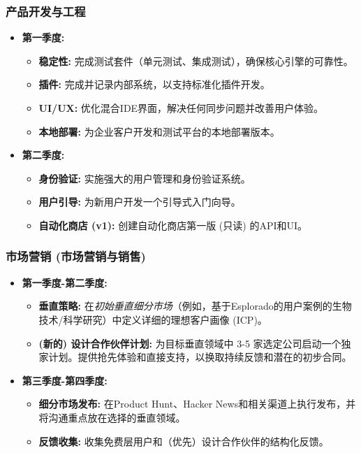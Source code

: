 \documentclass[11pt, a4paper, oneside]{article}
\begin{document}
\subsubsection{产品开发与工程}
\begin{itemize}[leftmargin=*]
    \item \textbf{第一季度:}
    \begin{itemize}
        \item \textbf{稳定性:} 完成测试套件（单元测试、集成测试），确保核心引擎的可靠性。
        \item \textbf{插件:} 完成并记录内部系统，以支持标准化插件开发。
        \item \textbf{UI/UX:} 优化混合IDE界面，解决任何同步问题并改善用户体验。
        \item \textbf{本地部署:} 为企业客户开发和测试平台的本地部署版本。
    \end{itemize}
    \item \textbf{第二季度:}
    \begin{itemize}
        \item \textbf{身份验证:} 实施强大的用户管理和身份验证系统。
        \item \textbf{用户引导:} 为新用户开发一个引导式入门向导。
        \item \textbf{自动化商店 (v1): } 创建自动化商店第一版 (只读) 的API和UI。
    \end{itemize}
\end{itemize}

\subsubsection{市场营销 (市场营销与销售)}
\begin{itemize}[leftmargin=*]
    \item \textbf{第一季度-第二季度:}
    \begin{itemize}
        \item \textbf{垂直策略:} 在\textit{初始垂直细分市场}（例如，基于Esplorado的用户案例的生物技术/科学研究）中定义详细的理想客户画像 (ICP)。
        \item \textbf{(新的) 设计合作伙伴计划:} 为目标垂直领域中 3-5 家选定公司启动一个独家计划。提供抢先体验和直接支持，以换取持续反馈和潜在的初步合同。
    \end{itemize}
    \item \textbf{第三季度-第四季度:}
    \begin{itemize}
        \item \textbf{细分市场发布:} 在Product Hunt、Hacker News和相关渠道上执行发布，并将沟通重点放在选择的垂直领域。
        \item \textbf{反馈收集:} 收集免费层用户和（优先）设计合作伙伴的结构化反馈。
    \end{itemize}
\end{itemize}
\end{document}
